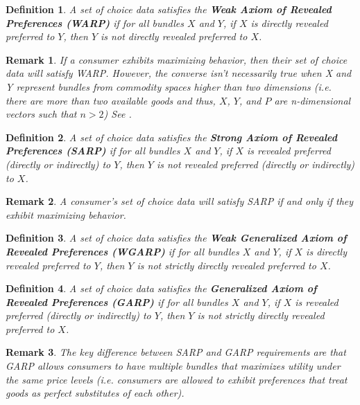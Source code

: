 \documentclass{article} %
\newtheorem{definition}{Definition} %
\newtheorem{remark}{Remark}
\begin{document}
\begin{definition}
A set of choice data satisfies the \textbf{Weak Axiom of Revealed Preferences (WARP)} if for all bundles $X$ and $Y$, if $X$ is directly revealed preferred to $Y$, then $Y$ is not directly revealed preferred to $X$.
\end{definition}

\begin{remark}
If a consumer exhibits maximizing behavior, then their set of choice data will satisfy WARP. However, the converse isn't necessarily true when X and Y represent bundles from commodity spaces higher than two dimensions (i.e. there are more than two available goods and thus, $X$, $Y$, and $P$ are n-dimensional vectors such that $n> 2$)  See \citet{Rose1958Consistency-of-Preference:-The-Two-Commodity-Case}. 
\end{remark}

\begin{definition}
A set of choice data satisfies the \textbf{Strong Axiom of Revealed Preferences (SARP)} if for all bundles $X$ and $Y$, if $X$ is revealed preferred (directly or indirectly) to $Y$, then $Y$ is not revealed preferred (directly or indirectly) to $X$.
\end{definition}

\begin{remark}
A consumer's set of choice data will satisfy SARP if and only if they exhibit maximizing behavior. 
\end{remark}

\begin{definition}
A set of choice data satisfies the \textbf{Weak Generalized Axiom of Revealed Preferences (WGARP)} if for all bundles $X$ and $Y$, if $X$ is directly revealed preferred to $Y$, then $Y$ is not strictly directly revealed preferred to $X$.
\end{definition}

\begin{definition}
A set of choice data satisfies the \textbf{Generalized Axiom of Revealed Preferences (GARP)} if for all bundles $X$ and $Y$, if $X$ is revealed preferred (directly or indirectly) to $Y$, then $Y$ is not strictly directly revealed preferred to $X$.
\end{definition}

\begin{remark}
The key difference between SARP and GARP requirements are that GARP allows consumers to have multiple bundles that maximizes utility under the same price levels (i.e. consumers are allowed to exhibit preferences that treat goods as perfect substitutes of each other).
\end{remark}
\end{document}
